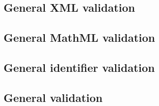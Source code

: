 \subsection*{General XML validation} \begin{sbmlenum}


\end{sbmlenum} \subsection*{General MathML validation} \begin{sbmlenum}


\begin{blockChanged}


\end{blockChanged}


\end{sbmlenum} \subsection*{General identifier validation}  \begin{sbmlenum}


\end{sbmlenum} \subsection*{General  validation} \begin{sbmlenum}



\end{sbmlenum}
